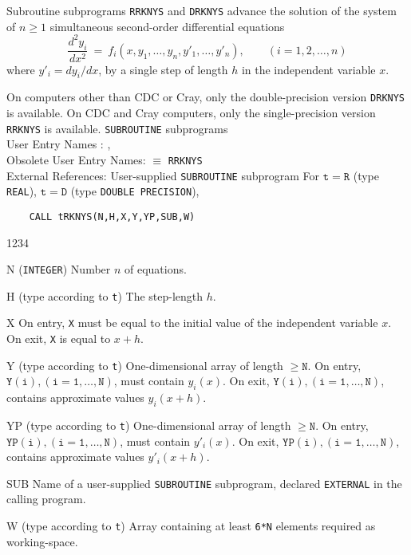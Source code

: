                           
                 
\Submitter{}                             
               
Subroutine subprograms {\tt RRKNYS}  and {\tt DRKNYS} advance the
solution of the system of $n \ge 1$ simultaneous second-order
differential equations
$$ \frac{d^2y_i}{dx^2} \ = \
f_i(x,y_1,\ldots,y_n,y'_1,\ldots,y'_n), \qquad (i = 1,2,\ldots,n)$$
where $y'_i = dy_i/dx$,
by a single step of length $h$ in the independent variable $x$.
\par
On computers other than CDC or Cray, only the double-precision version
{\tt DRKNYS} is available. On CDC and Cray computers, only the
single-precision version {\tt RRKNYS} is available.
\Structure
{\tt SUBROUTINE} subprograms \\
User Entry Names : , \\
Obsolete User Entry Names:  $\equiv$ {\tt RRKNYS} \\
External References: User-supplied {\tt SUBROUTINE} subprogram
\Usage
For $\mathtt{t=R}$ (type {\tt REAL}), $\mathtt{t=D}$ (type
{\tt DOUBLE PRECISION}),
\begin{verbatim}
    CALL tRKNYS(N,H,X,Y,YP,SUB,W)
\end{verbatim}
\begin{DLtt}{1234}
\item[N] ({\tt INTEGER}) Number $n$ of equations.
\item[H] (type according to {\tt t}) The  step-length $h$.
\item[X] On entry, {\tt X} must be equal to the initial value of the
independent variable $x$. On exit, {\tt X} is equal to $x+h$.
\item[Y] (type according to {\tt t})
One-dimensional array of length $\mathtt{\ge N}$.
On entry, $\mathtt{Y(i),(i=1,\ldots,N)}$, must contain $y_i(x)$.
On exit, $\mathtt{Y(i),(i=1,\ldots,N)}$, contains approximate values
 $y_i(x+h)$.
\item[YP] (type according to {\tt t}) One-dimensional array of length
$\mathtt{\ge N}$. On entry, $\mathtt{YP(i),(i=1,\ldots,N)}$, must
contain $y'_i(x)$. On exit, $\mathtt{YP(i),(i=1,\ldots,N)}$, contains
approximate values $y'_i(x+h)$.
\item[SUB] Name of a user-supplied {\tt SUBROUTINE} subprogram,
declared {\tt EXTERNAL} in the calling program.
\item[W] (type according to {\tt t}) Array containing at least
{\tt 6*N} elements required as working-space.
\end{DLtt}
